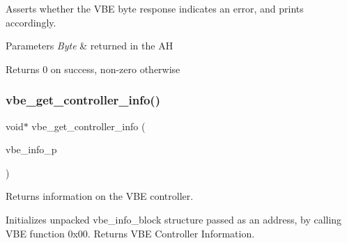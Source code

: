 Asserts whether the V\+BE byte response indicates an error, and prints accordingly. 


\begin{DoxyParams}{Parameters}
{\em Byte} & returned in the AH\\
\hline
\end{DoxyParams}
\begin{DoxyReturn}{Returns}
0 on success, non-\/zero otherwise 
\end{DoxyReturn}
\hypertarget{group__vbe_ga802bfdaa0b951c9fc68eff68d1b27436}{}\label{group__vbe_ga802bfdaa0b951c9fc68eff68d1b27436} 
\subsubsection{\texorpdfstring{vbe\+\_\+get\+\_\+controller\+\_\+info()}{vbe\_get\_controller\_info()}}
{\footnotesize\ttfamily void$\ast$ vbe\+\_\+get\+\_\+controller\+\_\+info (\begin{DoxyParamCaption}\item[{vbe\+\_\+info\+\_\+block $\ast$}]{vbe\+\_\+info\+\_\+p }\end{DoxyParamCaption})}



Returns information on the V\+BE controller. 

Initializes unpacked vbe\+\_\+info\+\_\+block structure passed as an address, by calling V\+BE function 0x00. Returns V\+BE Controller Information.


